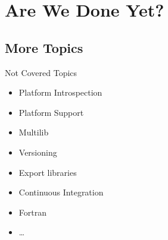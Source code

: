 \section{Are We Done Yet?}

\subsection{More Topics}

\begin{frame}[fragile]{Not Covered Topics}
\begin{itemize}
\item Platform Introspection 
\item Platform Support 
\item Multilib 
\item Versioning
\item Export libraries 
\item Continuous Integration
\item Fortran
\item \dots
\end{itemize}
\end{frame}




